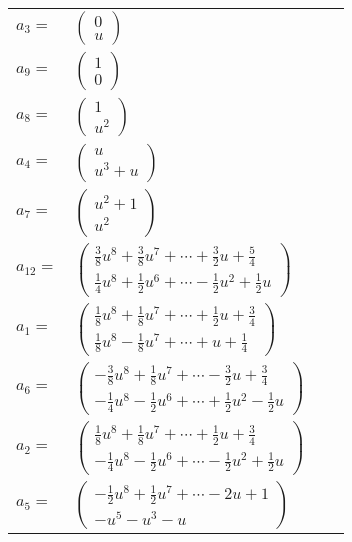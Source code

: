 \documentclass[1p]{elsarticle_modified}
\theoremstyle{definition}
\begin{document}
\begin{tabular}{m{7pt} m{180pt} m{7pt} m{180pt} }
\flushright $a_{3}=$&$\begin{pmatrix}0\\u\end{pmatrix}$ \\
\flushright $a_{9}=$&$\begin{pmatrix}1\\0\end{pmatrix}$ \\
\flushright $a_{8}=$&$\begin{pmatrix}1\\u^2\end{pmatrix}$ \\
\flushright $a_{4}=$&$\begin{pmatrix}u\\u^3+u\end{pmatrix}$ \\
\flushright $a_{7}=$&$\begin{pmatrix}u^2+1\\u^2\end{pmatrix}$ \\
\flushright $a_{12}=$&$\begin{pmatrix}\frac{3}{8} u^8+\frac{3}{8} u^7+\cdots+\frac{3}{2} u+\frac{5}{4}\\\frac{1}{4} u^8+\frac{1}{2} u^6+\cdots-\frac{1}{2} u^2+\frac{1}{2} u\end{pmatrix}$ \\
\flushright $a_{1}=$&$\begin{pmatrix}\frac{1}{8} u^8+\frac{1}{8} u^7+\cdots+\frac{1}{2} u+\frac{3}{4}\\\frac{1}{8} u^8-\frac{1}{8} u^7+\cdots+u+\frac{1}{4}\end{pmatrix}$ \\
\flushright $a_{6}=$&$\begin{pmatrix}-\frac{3}{8} u^8+\frac{1}{8} u^7+\cdots-\frac{3}{2} u+\frac{3}{4}\\-\frac{1}{4} u^8-\frac{1}{2} u^6+\cdots+\frac{1}{2} u^2-\frac{1}{2} u\end{pmatrix}$ \\
\flushright $a_{2}=$&$\begin{pmatrix}\frac{1}{8} u^8+\frac{1}{8} u^7+\cdots+\frac{1}{2} u+\frac{3}{4}\\-\frac{1}{4} u^8-\frac{1}{2} u^6+\cdots-\frac{1}{2} u^2+\frac{1}{2} u\end{pmatrix}$ \\
\flushright $a_{5}=$&$\begin{pmatrix}-\frac{1}{2} u^8+\frac{1}{2} u^7+\cdots-2 u+1\\- u^5- u^3- u\end{pmatrix}$ \\

\end{tabular}
\end{document}
